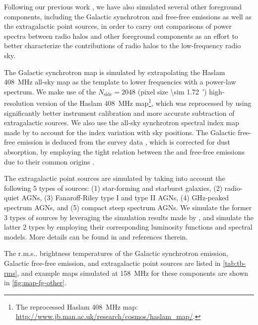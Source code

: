 \documentclass[modern]{aastex62}
\makeatletter
\newcommand{\R}[1]{\mathrm{#1}}
\newcommand{\Halpha}{\text{H$\alpha$}}
\newcommand{\rms}{r.m.s\@ifnextchar.{}{.\@}}
\makeatother
\begin{document}
Following our previous work \citep{wang2010}, we have also simulated
several other foreground components, including the Galactic synchrotron
and free-free emissions as well as the extragalactic point sources,
in order to carry out comparisons of power spectra between radio halos
and other foreground components as an effort to better characterize the
contributions of radio halos to the low-frequency radio sky.

The Galactic synchrotron map is simulated by extrapolating the
Haslam \SI{408}{\MHz} all-sky map as the template to lower frequencies
with a power-law spectrum.
We make use of the $N_{\R{side}} = 2048$
(pixel size \SI{\sim 1.72}{\arcminute})
high-resolution version of the Haslam \SI{408}{\MHz} map\footnote{%
  The reprocessed Haslam \SI{408}{\MHz} map:
  \url{http://www.jb.man.ac.uk/research/cosmos/haslam_map/}.},
which was reprocessed by \citet{remazeilles2015} using significantly
better instrument calibration and more accurate subtraction of
extragalactic sources.
We also use the all-sky synchrotron spectral index map made by
\citet{giardino2002} to account for the index variation with sky positions.
The Galactic free-free emission is deduced from the \Halpha{} survey
data \citep{finkbeiner2003}, which is corrected for dust absorption,
by employing the tight relation between the \Halpha{} and free-free
emissions due to their common origins \citep{dickinson2003}.

The extragalactic point sources are simulated by taking into account the
following 5 types of sources: (1) star-forming and starburst galaxies,
(2) radio-quiet AGNs, (3) Fanaroff-Riley type I and type II AGNs,
(4) GHz-peaked spectrum AGNs, and (5) compact steep spectrum AGNs.
We simulate the former 3 types of sources by leveraging the simulation
results made by \citet{wilman2008}, and simulate the latter 2 types
by employing their corresponding luminosity functions and spectral models.
More details can be found in \citet{wang2010} and references therein.

The \rms{} brightness temperatures of the Galactic synchrotron emission,
Galactic free-free emission, and extragalactic point sources are listed
in \autoref{tab:tb-rms}, and example maps simulated at \SI{158}{\MHz}
for these components are shown in \autoref{fig:map-fg-other}.
\end{document}
